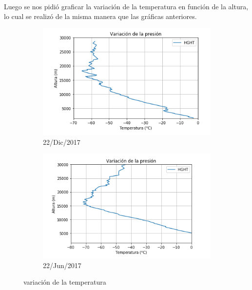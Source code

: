 \documentclass{article}
\begin{document}
Luego se nos pidió graficar la variación de la temperatura en función de la altura, lo cual se realizó de la misma manera que las gráficas anteriores.
\begin{figure}[h!]
	\begin{subfigure}[b]{0.5\linewidth}
    \raggedleft
	\includegraphics[width=\linewidth]{4thInstDec.png}
    \caption{22/Dic/2017}
	\end{subfigure}
	\begin{subfigure}[b]{0.5\linewidth}
    \raggedright
	\includegraphics[width=\linewidth]{4thInstJun.png}
    \caption{22/Jun/2017}
	\end{subfigure}
    \caption{variación de la temperatura}
\end{figure}
\end{document}
